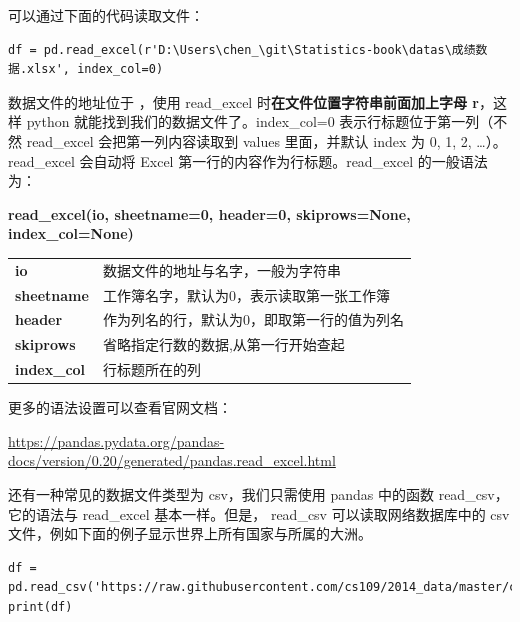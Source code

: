 可以通过下面的代码读取文件：

\begin{lstlisting}[Language=Python]
df = pd.read_excel(r'D:\Users\chen_\git\Statistics-book\datas\成绩数据.xlsx', index_col=0)
\end{lstlisting}

数据文件的地址位于 ，使用 read\_excel 时\textbf{在文件位置字符串前面加上字母 r}，这样 python 就能找到我们的数据文件了。index\_col=0 表示行标题位于第一列（不然 read\_excel 会把第一列内容读取到 values 里面，并默认 index 为 0, 1, 2, \dots）。read\_excel 会自动将 Excel 第一行的内容作为行标题。read\_excel 的一般语法为：

\begin{center}
\begin{tcolorbox}[title = read\_excel 函数的语法]
\textbf{read\_excel(io, sheetname=0, header=0, skiprows=None,  index\_col=None)}
\tcblower
\vspace{10pt}

\begin{tcboutputlisting}
\begin{tabular}{>{\bfseries}ll}
  io &数据文件的地址与名字，一般为字符串\\
  sheetname & 工作簿名字，默认为0，表示读取第一张工作簿\\
header &作为列名的行，默认为0，即取第一行的值为列名\\
skiprows&省略指定行数的数据,从第一行开始查起\\
index\_col&行标题所在的列\\
\end{tabular}
\end{tcboutputlisting}
\tcbuselistingtext

\end{tcolorbox}
\end{center}

\sloppy
更多的语法设置可以查看官网文档：

\href{https://pandas.pydata.org/pandas-docs/version/0.20/generated/pandas.read\_excel.html}{https://pandas.pydata.org/pandas-docs/version/0.20/generated/pandas.read\_excel.html}

还有一种常见的数据文件类型为 csv，我们只需使用 pandas 中的函数 read\_csv，它的语法与 read\_excel 基本一样。但是， read\_csv 可以读取网络数据库中的 csv 文件，例如下面的例子显示世界上所有国家与所属的大洲。

\begin{lstlisting}[Language=Python]
df = pd.read_csv('https://raw.githubusercontent.com/cs109/2014_data/master/countries.csv')
print(df)
\end{lstlisting}

